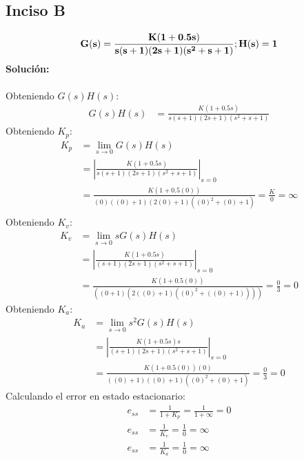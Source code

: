 \documentclass[11pt, twoside]{article}
\begin{document}
\subsection{Inciso B}
\begin{equation*}
    \mathbf{G(s)=\frac{K(1+0.5s)}{s(s+1)(2s+1)(s^{2}+s+1)};\space H(s)=1}
\end{equation*}
\textbf{Solución:}\\\\
Obteniendo $G(s)H(s)$:
\begin{align*}
    G(s)H(s) & = \frac{K(1+0.5s)}{s(s+1)(2s+1)(s^{2}+s+1)}
\end{align*}
Obteniendo $K_{p}$:
\begin{align*}
    K_{p} & = \lim_{s\to 0}{G(s)H(s)}                              \\
          & = \left|\frac{K(1+0.5s)}{s(s+1)(2s+1)(s^{2}+s+1)}\right|_{s=0}      \\
          & = \frac{K(1+0.5(0))}{(0)((0)+1)(2(0)+1)((0)^{2}+(0)+1)} = \frac{K}{0} = \boxed{\infty} \\
\end{align*}
Obteniendo $K_{v}$:
\begin{align*}
    K_{v} & = \lim_{s\to 0}{sG(s)H(s)}                \\
          & = \left|\frac{K(1+0.5s)}{(s+1)(2s+1)(s^{2}+s+1)}\right|_{s=0}       \\
          & = \frac{K(1+0.5(0))}{((0+1)(2((0)+1)((0)^{2}+((0)+1))))} = \frac{0}{3} = \boxed{0}
\end{align*}
Obteniendo $K_{a}$:
\begin{align*}
    K_{a} & = \lim_{s\to0}{s^{2}G(s)H(s)}                    \\
          & = \left|\frac{K(1+0.5s)s}{(s+1)(2s+1)(s^{2}+s+1)}\right|_{s=0}             \\
          & = \frac{K(1+0.5(0))(0)}{((0)+1)((0)+1)((0)^{2}+(0)+1)} = \frac{0}{3} = \boxed{0}
\end{align*}
\newpage
Calculando el error en estado estacionario:
\begin{align*}
    e_{ss} & = \frac{1}{1+K_{p}} = \frac{1}{1+\infty} = \boxed{0}              \\
    e_{ss} & = \frac{1}{K_{v}} = \frac{1}{0} = \boxed{\infty} \\
    e_{ss} & = \frac{1}{K_{a}} = \frac{1}{0} = \boxed{\infty}
\end{align*}
\end{document}
